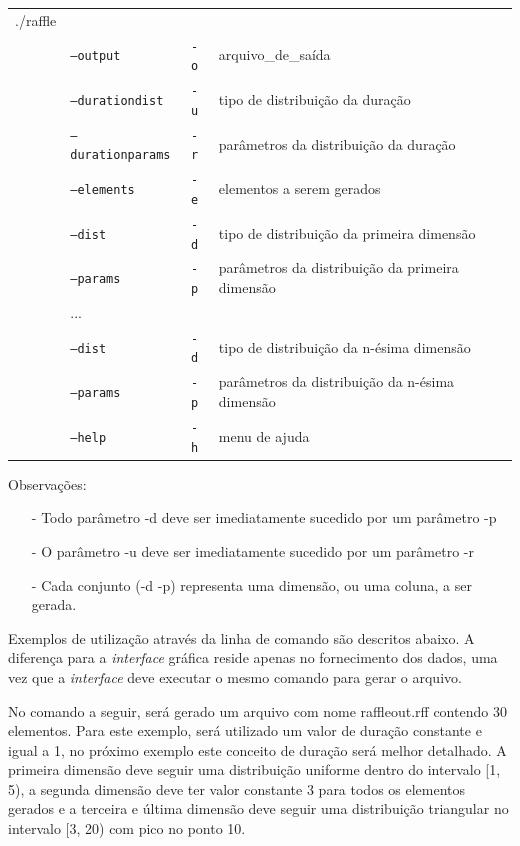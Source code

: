 \begin{table}[!h]
	\begin{tabular}{llll}
	./raffle & & \\ 
	& \texttt{--output} & \texttt{-o}  & arquivo\_de\_saída \\
	& \texttt{--durationdist} & \texttt{-u}  & tipo de distribuição da duração \\
	& \texttt{--durationparams} & \texttt{-r}  & parâmetros da distribuição da duração \\
	& \texttt{--elements} & \texttt{-e}  & elementos a serem gerados \\
	& \texttt{--dist} & \texttt{-d}  & tipo de distribuição da primeira dimensão \\
	& \texttt{--params} & \texttt{-p}  & parâmetros da distribuição da primeira dimensão \\
	& ... & \\
	& \texttt{--dist} & \texttt{-d}  & tipo de distribuição da n-ésima dimensão \\
	& \texttt{--params} & \texttt{-p}  & parâmetros da distribuição da n-ésima dimensão \\
	& \texttt{--help} & \texttt{-h}  & menu de ajuda \\
	\end{tabular}
\end{table}

Observações:
\begin{itemize}
    \item[-] Todo parâmetro -d deve ser imediatamente sucedido por um parâmetro -p
    \item[-] O parâmetro -u deve ser imediatamente sucedido por um parâmetro -r
    \item[-] Cada conjunto (-d -p) representa uma dimensão, ou uma coluna, a ser gerada.
\end{itemize}

Exemplos de utilização através da linha de comando são descritos abaixo. A diferença para a \emph{interface} gráfica reside apenas no fornecimento dos dados, uma vez que a \emph{interface} deve executar o mesmo comando para gerar o arquivo.

No comando a seguir, será gerado um arquivo com nome raffleout.rff contendo 30 elementos. Para este exemplo, será utilizado um valor de duração constante e igual a 1, no próximo exemplo este conceito de duração será melhor detalhado. A primeira dimensão deve seguir uma distribuição uniforme dentro do intervalo [1, 5), a segunda dimensão deve ter valor constante 3 para todos os elementos gerados e a terceira e última dimensão deve seguir uma distribuição triangular no intervalo [3, 20) com pico no ponto 10.

